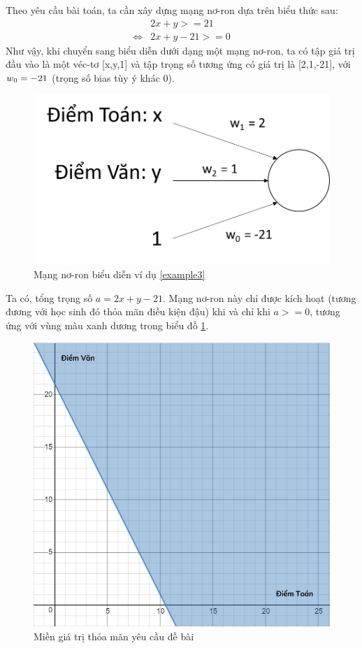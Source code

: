 \begin{answ}
Theo yêu cầu bài toán, ta cần xây dựng mạng nơ-ron dựa trên biểu thức sau:
\begin{align*}
  &2x + y >= 21 \\
  \Leftrightarrow &2x + y -21 >= 0
\end{align*}
Như vậy, khi chuyển sang biểu diễn dưới dạng một mạng nơ-ron, ta có tập giá trị đầu vào là một véc-tơ [x,y,1] và tập trọng số tương ứng có giá trị là [2,1,-21], với \(w\textsubscript{0} = -21\) (trọng số bias tùy ý khác 0). 

\begin{figure}[h]
	\centering
		\includegraphics[width=0.5\columnwidth]{chapter01/figure/example 3.png}
        \caption{Mạng nơ-ron biểu diễn ví dụ \ref{example3}}
		\centering
\end{figure}

Ta có, tổng trọng số \(a = 2x + y - 21\). Mạng nơ-ron này chỉ được kích hoạt (tương đương với học sinh đó thỏa mãn điều kiện đậu) khi và chỉ khi \(a >= 0\), tương ứng với vùng màu xanh dương trong biểu đồ \ref{fig:example3-miengiatri}.

\begin{figure}[!h]
	\centering
		\includegraphics[width=0.55\columnwidth]{chapter01/figure/example 3 - graph 1.PNG}
        \caption{Miền giá trị thỏa mãn yêu cầu đề bài}
        \label{fig:example3-miengiatri}
		\centering
\end{figure}


\end{answ}
